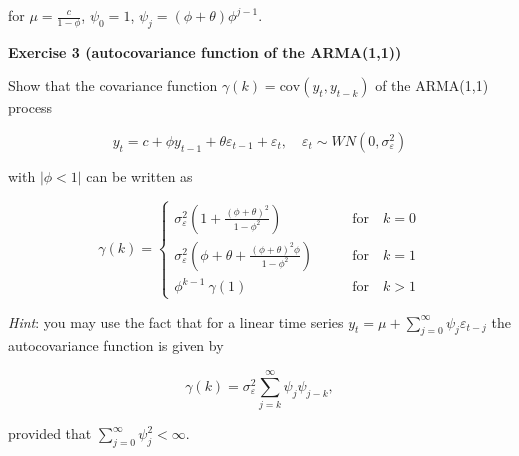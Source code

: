 \documentclass[
]{book}
\begin{document}
for \(\mu = \frac{c}{1-\phi}\), \(\psi_0 = 1\), \(\psi_j = (\phi + \theta)\phi^{j-1}\).

\textbf{Exercise 3 (autocovariance function of the ARMA(1,1))}

Show that the covariance function \(\gamma(k) = \text{cov}(y_t, y_{t-k})\) of the ARMA(1,1) process

\[
y_t = c + \phi y_{t-1} + \theta \varepsilon_{t-1} + \varepsilon_t, \quad \varepsilon_t \sim WN(0, \sigma^2_\varepsilon)
\]

with \(|\phi < 1|\) can be written as

\[
\gamma(k) = 
\begin{cases}
\sigma^2_\varepsilon \left(1 + \frac{(\phi+\theta)^2}{1-\phi^2}\right) & \qquad \text{for} \quad k=0 \\[1em]
\sigma^2_\varepsilon \left(\phi+\theta + \frac{(\phi+\theta)^2\phi}{1-\phi^2}\right) & \qquad \text{for} \quad k=1 \\[1em]
\phi^{k-1} \ \gamma(1) &  \qquad \text{for} \quad k>1 
\end{cases}
\]

\emph{Hint}: you may use the fact that for a linear time series \(y_t = \mu + \sum_{j=0}^\infty \psi_j \varepsilon_{t-j}\) the autocovariance function is given by

\[
\gamma(k) = \sigma^2_\varepsilon \sum_{j=k}^\infty \psi_j \psi_{j-k},
\]

provided that \(\sum_{j=0}^{\infty} \psi_j^2 < \infty\).

  
\end{document}
